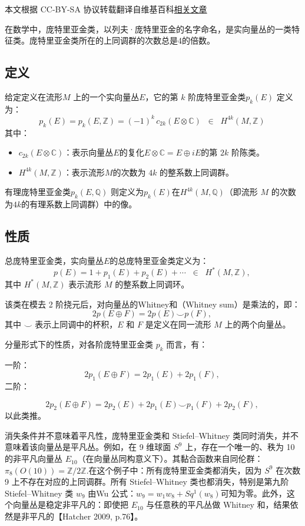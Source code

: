 
本文根据 CC-BY-SA 协议转载翻译自维基百科\href{https://en.wikipedia.org/wiki/Pontryagin_class}{相关文章}

在数学中，庞特里亚金类，以列夫·庞特里亚金的名字命名，是实向量丛的一类特征类。庞特里亚金类所在的上同调群的次数总是4的倍数。
\subsection{定义}
给定定义在流形$M$ 上的一个实向量丛$E$，它的第 $k$ 阶庞特里亚金类$p_k(E)$ 定义为：
$$
p_k(E) = p_k(E, \mathbb{Z}) = (-1)^k \, c_{2k}(E \otimes \mathbb{C}) 
\;\; \in \;\; H^{4k}(M, \mathbb{Z})~
$$
其中：
\begin{itemize}
\item $c_{2k}(E \otimes \mathbb{C})$：表示向量丛$E$的复化$E \otimes \mathbb{C} = E \oplus iE$的第 $2k$ 阶陈类。
\item $H^{4k}(M, \mathbb{Z})$：表示流形$M$的次数为 $4k$ 的整系数上同调群。
\end{itemize}
有理庞特里亚金类$p_k(E, \mathbb{Q})$ 则定义为$p_k(E)$在$H^{4k}(M, \mathbb{Q})$（即流形 $M$ 的次数为$4k$的有理系数上同调群）中的像。
\subsection{性质}
总庞特里亚金类，实向量丛$E$的总庞特里亚金类定义为：
$$
p(E) = 1 + p_1(E) + p_2(E) + \cdots \;\;\in\;\; H^*(M, \mathbb{Z}),~
$$
其中 $H^*(M, \mathbb{Z})$ 表示流形 $M$ 的整系数上同调环。

该类在模去 2 阶挠元后，对向量丛的Whitney和（Whitney sum）是乘法的，即：
$$
2p(E \oplus F) = 2p(E) \smile p(F),~
$$
其中 $\smile$ 表示上同调中的杯积，$E$ 和 $F$ 是定义在同一流形 $M$ 上的两个向量丛。

分量形式下的性质，对各阶庞特里亚金类 $p_k$ 而言，有：

一阶：
  $$
  2p_1(E \oplus F) = 2p_1(E) + 2p_1(F),~
  $$
二阶：

  $$
  2p_2(E \oplus F) = 2p_2(E) + 2p_1(E) \smile p_1(F) + 2p_2(F),~
  $$
以此类推。

消失条件并不意味着平凡性，庞特里亚金类和 Stiefel–Whitney 类同时消失，并不意味着该向量丛是平凡丛。例如，在 9 维球面 $S^9$ 上，存在一个唯一的、秩为 10 的非平凡向量丛 $E_{10}$（在向量丛同构意义下）。其黏合函数来自同伦群：
$\pi_8(O(10)) = \mathbb{Z}/2\mathbb{Z}$.在这个例子中：所有庞特里亚金类都消失，因为 $S^9$ 在次数 9 上不存在对应的上同调群。所有 Stiefel–Whitney 类也都消失，特别是第九阶 Stiefel–Whitney 类 $w_9$ 由Wu 公式：$w_9 = w_1 w_8 + Sq^1(w_8)$可知为零。此外，这个向量丛是稳定非平凡的：即使把 $E_{10}$ 与任意秩的平凡丛做 Whitney 和，结果依然是非平凡的【Hatcher 2009, p.76】。

